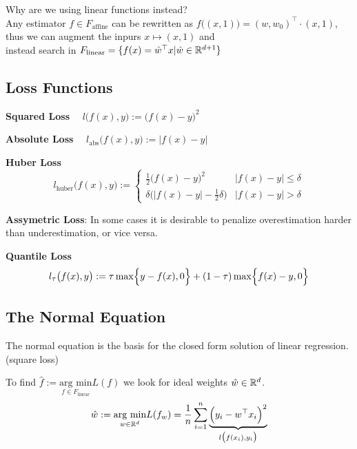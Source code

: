 \remark Why are we using linear functions instead?\\
{\footnotesize\color{gray}
    Any estimator $f \in F_\text{affine}$ can be rewritten as $f\bigl((x,1)\bigr) = (w,w_0)^\top\cdot(x,1)$,
    thus we can augment the inpurs $x \mapsto (x,1)$ and \\
    instead search in $F_\text{linear} = \{ f(x) = \hat{w}^\top x | \hat{w} \in \mathbb{R}^{d+1} \}$
}

\subsection{Loss Functions}

 \textbf{Squared Loss} $\quad l\bigl( f(x),y \bigr) := \bigl( f(x) - y \bigr)^2$\\

 \textbf{Absolute Loss} $\quad l_\text{abs}\bigl( f(x),y \bigr) := |f(x)-y|$\\

 \textbf{Huber Loss}
$$
    l_\text{huber}\bigl( f(x),y \bigr) := \begin{cases}
        \frac{1}{2}\bigl( f(x)-y \bigr)^2                   & |f(x)-y| \leq \delta \\
        \delta \bigl( |f(x)-y| - \frac{1}{2}\delta \bigr)   & |f(x)-y| > \delta
    \end{cases}
$$

\textbf{Assymetric Loss}: In some cases it is desirable to penalize overestimation harder than underestimation, or vice versa.

 \textbf{Quantile Loss}
$$
    l_\tau\bigl( f(x),y \bigr) := \tau \max\Bigl\{ y-f(x),0 \Bigr\} + (1-\tau)\max\Bigl\{ f(x)-y, 0 \Bigr\}
$$

\newpage

\subsection{The Normal Equation}
The normal equation is the basis for the closed form solution of linear regression. (square loss)

To find $\hat{f} := \underset{f \in F_\text{linear}}{\text{arg min}} L(f)$ we look for ideal weights $\hat{w} \in \mathbb{R}^d$.
$$
    \hat{w} := \underset{w \in \mathbb{R}^d}{\text{arg min}} L(f_w) = \frac{1}{n}\sum_{i=1}^{n}\underbrace{\Bigl( y_i - w^\top x_i \Bigr)^2}_{l\bigl(f(x_i), y_i\bigr)}
$$

